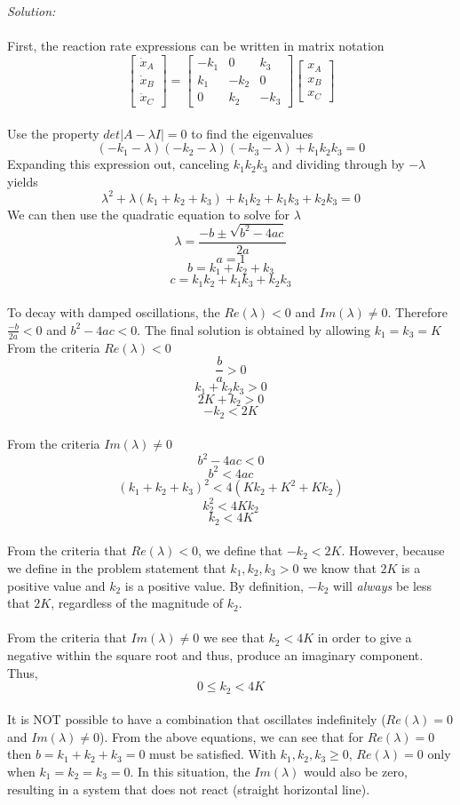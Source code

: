 \documentclass[10pt]{article}
\begin{document}
{\em Solution:}  
\\
\\
First, the reaction rate expressions can be written in matrix notation
\[ \left[ \begin{array}{c} \dot{x}_A \\ \dot{x}_B \\\dot{x}_C \end{array} \right] = \left[ \begin{array}{ccc} -k_1 & 0 & k_3 \\ k_1 & -k_2 & 0 \\ 0 & k_2 & -k_3 \end{array} \right] \left[ \begin{array}{c} x_A \\ x_B \\x_C \end{array} \right] \]
\\
Use the property $det|A- \lambda I|=0$ to find the eigenvalues
\[(-k_1- \lambda)(-k_2-\lambda)(-k_3-\lambda)+k_1k_2k_3=0 \]
Expanding this expression out, canceling $k_1k_2k_3$  and dividing through by $-\lambda$ yields
\[\lambda^2+\lambda(k_1+k_2+k_3)+k_1k_2+k_1k_3+k_2k_3=0 \]
We can then use the quadratic equation to solve for $\lambda$
\[\lambda=\frac{-b \pm \sqrt{b^2-4ac}}{2a}\]
\[a=1\]
\[b=k_1+k_2+k_3 \]
\[c=k_1k_2+k_1k_3+k_2k_3 \]
\\
To decay with damped oscillations, the $Re(\lambda)<0$ and $Im(\lambda)\neq 0$. Therefore $\frac{-b}{2a}<0$ and $b^2-4ac<0$. The final solution is obtained by allowing $k_1=k_3=K$
\\
From the criteria $Re(\lambda)<0$
\[\frac{b}{a}>0\]
\[k_1+k_2k_3>0 \]
\[2K+k_2>0 \]
\[-k_2<2K\]
\\
From the criteria $Im(\lambda)\neq 0$
\[b^2-4ac<0 \]
\[b^2<4ac \]
\[(k_1+k_2+k_3)^2<4(Kk_2+K^2+Kk_2)\]
\[k_2^2<4Kk_2 \]
\[k_2<4K \]
\\
From the criteria that $Re(\lambda)<0$, we define that $-k_2<2K$. However, because we define in the problem statement that $k_1, k_2, k_3>0$ we know that $2K$ is a positive value and $k_2$ is a positive value. By definition, $-k_2$ will \textit{always} be less that $2K$, regardless of the magnitude of $k_2$. \\
\\
From the criteria that $Im(\lambda) \neq 0$ we see that $k_2<4K$ in order to give a negative within the square root and thus, produce an imaginary component. 
\\
Thus,
\[0 \leq k_2 < 4K \]
\\
It is NOT possible to have a combination that oscillates indefinitely ($Re(\lambda)=0$ and $Im(\lambda) \neq 0$). From the above equations, we can see that for $Re(\lambda)=0$ then $b=k_1+k_2+k_3=0$ must be satisfied. With $k_1, k_2, k_3 \geq 0$, $Re(\lambda)=0$ only when $k_1=k_2=k_3=0$. In this situation, the $Im(\lambda)$ would also be zero, resulting in a system that does not react (straight horizontal line). 
\end{document}
